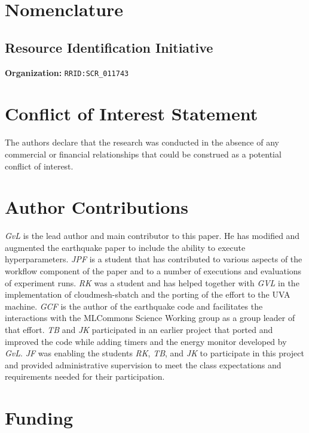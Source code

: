 \documentclass[utf8]{FrontiersinVancouver} %
\begin{document}
\clearpage

\section{Nomenclature}

\subsection{Resource Identification Initiative}

{\bf Organization:} \verb|RRID:SCR_011743|

\section*{Conflict of Interest Statement}

The authors declare that the research was conducted in the absence of
any commercial or financial relationships that could be construed as a
potential conflict of interest.

\section*{Author Contributions}

{\em GvL} is the lead author and main contributor to this paper. He
has modified and augmented the earthquake paper to include the ability
to execute hyperparameters. {\em JPF} is a student that has
contributed to various aspects of the workflow component of the paper
and to a number of executions and evaluations of experiment runs. {\em
  RK} was a student and has helped together with {\em GVL} in the
implementation of cloudmesh-sbatch and the porting of the effort to
the UVA machine.  {\em GCF} is the author of the earthquake code and
facilitates the interactions with the MLCommons Science Working group
as a group leader of that effort. {\em TB} and {\em JK} participated
in an earlier project that ported and improved the code while adding
timers and the energy monitor developed by {\em GvL}. {\em JF} was
enabling the students {\em RK}, {\em TB}, and {\em JK} to participate
in this project and provided administrative supervision to meet the
class expectations and requirements needed for their participation.

\section*{Funding}
\end{document}
